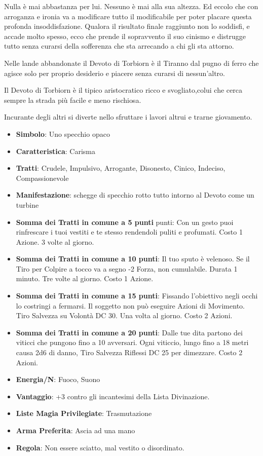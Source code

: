 \begin{multicols}{2}
Nulla è mai abbastanza per lui. Nessuno è mai alla sua altezza. Ed eccolo che con arroganza e ironia va a modificare tutto il modificabile per poter placare questa profonda insoddisfazione. Qualora il risultato finale raggiunto non lo soddisfi, e accade molto spesso, ecco che prende il sopravvento il suo cinismo e distrugge tutto senza curarsi della sofferenza che sta arrecando a chi gli sta attorno.

Nelle lande abbandonate il Devoto di Torbiorn è il Tiranno dal pugno di ferro che agisce solo per proprio desiderio e piacere senza curarsi di nessun'altro.

Il Devoto di Torbiorn è il tipico aristocratico ricco e svogliato,colui che cerca sempre la strada più facile e meno rischiosa.

Incurante degli altri si diverte nello sfruttare i lavori altrui e trarne giovamento.

\begin{itemize}[leftmargin=*] \setlength{\itemsep}{0pt}
\item \textbf{Simbolo}: Uno specchio opaco
\item \textbf{Caratteristica}: Carisma
\item \textbf{Tratti}: Crudele, Impulsivo, Arrogante, Disonesto, Cinico, Indeciso, Compassionevole
\item \textbf{Manifestazione}: schegge di specchio rotto tutto intorno al Devoto come un turbine
\item \textbf{Somma dei Tratti in comune a 5 punti} punti: Con un gesto puoi rinfrescare i tuoi vestiti e te stesso rendendoli puliti e profumati. Costo 1 Azione. 3 volte al giorno.
\item \textbf{Somma dei Tratti in comune a 10 punti}: Il tuo sputo è velenoso. Se il Tiro per Colpire a tocco va a segno -2 Forza, non cumulabile. Durata 1 minuto. Tre volte al giorno. Costo 1 Azione.
\item \textbf{Somma dei Tratti in comune a 15 punti}: Fissando l'obiettivo negli occhi lo costringi a fermarsi. Il soggetto non può eseguire Azioni di Movimento. Tiro Salvezza su Volontà DC 30. Una volta al giorno. Costo 2 Azioni.
\item \textbf{Somma dei Tratti in comune a 20 punti}: Dalle tue dita partono dei viticci che pungono fino a 10 avversari. Ogni viticcio, lungo fino a 18 metri causa 2d6 di danno, Tiro Salvezza Riflessi DC 25 per dimezzare. Costo 2 Azioni.
\item \textbf{Energia/N}: Fuoco, Suono
\item \textbf{Vantaggio}: +3 contro gli incantesimi della Lista Divinazione.
\item \textbf{Liste Magia Privilegiate}: Trasmutazione
\item \textbf{Arma Preferita}: Ascia ad una mano
\item \textbf{Regola}: Non essere sciatto, mal vestito o disordinato.
\end{itemize}


\end{multicols}

